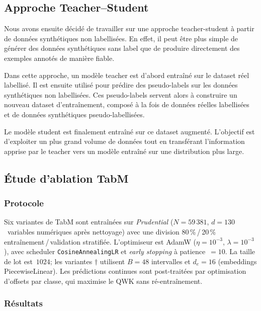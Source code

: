 \documentclass[conference]{IEEEtran}
\begin{document}
\subsection{Approche Teacher--Student}

Nous avons ensuite décidé de travailler sur une approche teacher-student à partir de données synthétiques non labellisées. En effet, il peut être plus simple de générer des données synthétiques sans label que de produire directement des exemples annotés de manière fiable.

Dans cette approche, un modèle teacher est d’abord entraîné sur le dataset réel labellisé. Il est ensuite utilisé pour prédire des pseudo-labels sur les données synthétiques non labellisées. Ces pseudo-labels servent alors à construire un nouveau dataset d’entraînement, composé à la fois de données réelles labellisées et de données synthétiques pseudo-labellisées.

Le modèle student est finalement entraîné sur ce dataset augmenté. L’objectif est d’exploiter un plus grand volume de données tout en transférant l’information apprise par le teacher vers un modèle entraîné sur une distribution plus large.


\subsection{Étude d'ablation TabM}

\subsubsection{Protocole}
Six variantes de TabM sont entraînées sur \textit{Prudential} ($N=59\,381$,
$d=130$~variables numériques après nettoyage) avec une division
80\,\%\,/\,20\,\% entraînement\,/\,validation stratifiée. L'optimiseur est
AdamW ($\eta=10^{-3}$, $\lambda=10^{-3}$), avec scheduler
\texttt{CosineAnnealingLR} et \textit{early stopping} à patience~$=10$.
La taille de lot est~$1024$; les variantes $\dagger$ utilisent $B=48$ intervalles
et $d_e=16$ (embeddings PiecewiseLinear). Les prédictions continues sont post-traitées
par optimisation d'offsets par classe, qui maximise le QWK sans ré-entraînement.

\subsubsection{Résultats}
\end{document}
